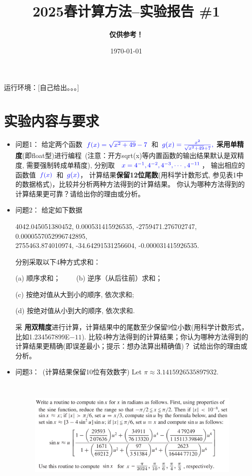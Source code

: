 \documentclass[UTF8]{ctexart}
\title{\textbf {2025春计算方法--实验报告 \#1}}
\author{\textbf{\color{red}仅供参考！}}
\date{\today}
\begin{document}
\maketitle

运行环境：[自己给出。。。]

\section*{实验内容与要求}
\begin{itemize}
  \item{问题1：}
  给定两个函数~$\color{blue}f(x)=\sqrt{x^2+49}-7$~和~$\color{blue}g(x)=\frac{x^2}{\sqrt{x^2+49}+7},$
{\bf\color{red} 采用单精度}(即float型)进行编程~(注意：开方sqrt(x)等内置函数的输出结果默认是双精度,
需要强制转成单精度), 分别取
~$\color{blue}x=4^{-1}, 4^{-2}, 4^{-3}, \cdots, 4^{-11}$，
输出相应的函数值~$\color{blue}f(x)$~和~$\color{blue}g(x)$，
计算结果{\bf 保留12位尾数}(用科学计数形式, 参见表1中的数据格式)，比较并分析两种方法得到的计算结果。
你认为哪种方法得到的计算结果更可靠？请给出你的理由或分析。

  \item{问题2：} 给定如下数据


4042.045051380452, 0.000531415926535, -2759471.276702747, 0.0000557052996742895, \\
2755463.874010974, -34.64291531256604,  -0.000031415926535.

分别采取以下4种方式求和：

(a) 顺序求和； ~~~~(b) 逆序（从后往前）求和；

(c) 按绝对值从大到小的顺序, 依次求和;

(d) 按绝对值从小到大的顺序, 依次求和.

采\textbf{\color{red}   用双精度}进行计算，计算结果中的尾数至少保留9位小数(用科学计数形式，比如1.234567899E$-11$).
比较4种方法得到的计算结果；你认为哪种方法得到的计算结果更精确(即误差最小；提示：想办法算出精确值)？
试给出你的理由或分析。


\item{问题3：~(计算结果保留10位有效数字)}  Let $\pi \approx 3.14159 26535 897932.$
\vspace{-0.1in}
\begin{figure}[htb]%
	\centering
        \includegraphics[width=5.40in,height=2.2in, angle=0]{image/lab01c}
\end{figure}


\end{itemize}
\end{document}
